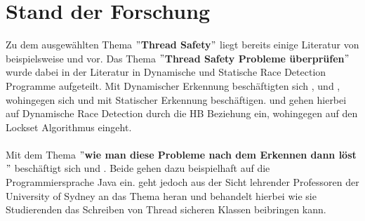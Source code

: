 \chapter{Stand der Forschung}

Zu dem ausgewählten Thema $"$\textbf{Thread Safety}$"$ liegt bereits einige Literatur von beispielsweise \textcite{li_efficient_2019} und \textcite{erickson_effective_nodate} vor. Das Thema $"$\textbf{Thread Safety Probleme überprüfen}$"$ wurde dabei in der Literatur in Dynamische und Statische Race Detection Programme aufgeteilt. Mit Dynamischer Erkennung beschäftigten sich \textcite{li_efficient_2019}, \textcite{erickson_effective_nodate} und \textcite{savage_eraser_nodate}, wohingegen sich \textcite{relay} und \textcite{racerd} mit Statischer Erkennung beschäftigen. \textcite{li_efficient_2019} und \textcite{erickson_effective_nodate} gehen hierbei auf Dynamische Race Detection durch die \ac{HB} Beziehung ein, wohingegen \textcite{savage_eraser_nodate} auf den Lockset Algorithmus eingeht.\\
\\
Mit dem Thema $"$\textbf{wie man diese Probleme nach dem Erkennen dann löst}$"$ beschäftigt sich \textcite{brian} und \textcite{fekete_teaching_nodate}. Beide gehen dazu beispielhaft auf die Programmiersprache Java ein. \textcite{fekete_teaching_nodate} geht jedoch aus der Sicht lehrender Professoren der University of Sydney an das Thema heran und behandelt hierbei wie sie Studierenden das Schreiben von Thread sicheren Klassen beibringen kann.